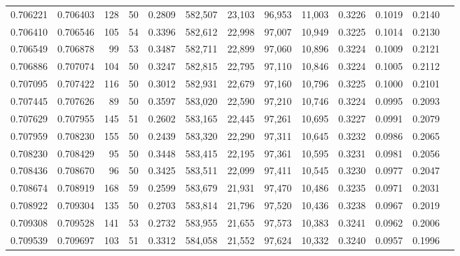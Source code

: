 \begin{tabular}{rrrrrrrrrrrrr}
0.706221 & 0.706403 &   128 &  50 &                                     0.2809 & 582,507 &  23,103 &  96,953 &  11,003 & 0.3226 & 0.1019 & 0.2140 \\
0.706410 & 0.706546 &   105 &  54 &                                     0.3396 & 582,612 &  22,998 &  97,007 &  10,949 & 0.3225 & 0.1014 & 0.2130 \\
0.706549 & 0.706878 &    99 &  53 &                                     0.3487 & 582,711 &  22,899 &  97,060 &  10,896 & 0.3224 & 0.1009 & 0.2121 \\
0.706886 & 0.707074 &   104 &  50 &                                     0.3247 & 582,815 &  22,795 &  97,110 &  10,846 & 0.3224 & 0.1005 & 0.2112 \\
0.707095 & 0.707422 &   116 &  50 &                                     0.3012 & 582,931 &  22,679 &  97,160 &  10,796 & 0.3225 & 0.1000 & 0.2101 \\
0.707445 & 0.707626 &    89 &  50 &                                     0.3597 & 583,020 &  22,590 &  97,210 &  10,746 & 0.3224 & 0.0995 & 0.2093 \\
0.707629 & 0.707955 &   145 &  51 &                                     0.2602 & 583,165 &  22,445 &  97,261 &  10,695 & 0.3227 & 0.0991 & 0.2079 \\
0.707959 & 0.708230 &   155 &  50 &                                     0.2439 & 583,320 &  22,290 &  97,311 &  10,645 & 0.3232 & 0.0986 & 0.2065 \\
0.708230 & 0.708429 &    95 &  50 &                                     0.3448 & 583,415 &  22,195 &  97,361 &  10,595 & 0.3231 & 0.0981 & 0.2056 \\
0.708436 & 0.708670 &    96 &  50 &                                     0.3425 & 583,511 &  22,099 &  97,411 &  10,545 & 0.3230 & 0.0977 & 0.2047 \\
0.708674 & 0.708919 &   168 &  59 &                                     0.2599 & 583,679 &  21,931 &  97,470 &  10,486 & 0.3235 & 0.0971 & 0.2031 \\
0.708922 & 0.709304 &   135 &  50 &                                     0.2703 & 583,814 &  21,796 &  97,520 &  10,436 & 0.3238 & 0.0967 & 0.2019 \\
0.709308 & 0.709528 &   141 &  53 &                                     0.2732 & 583,955 &  21,655 &  97,573 &  10,383 & 0.3241 & 0.0962 & 0.2006 \\
0.709539 & 0.709697 &   103 &  51 &                                     0.3312 & 584,058 &  21,552 &  97,624 &  10,332 & 0.3240 & 0.0957 & 0.1996 \\

\end{tabular}
